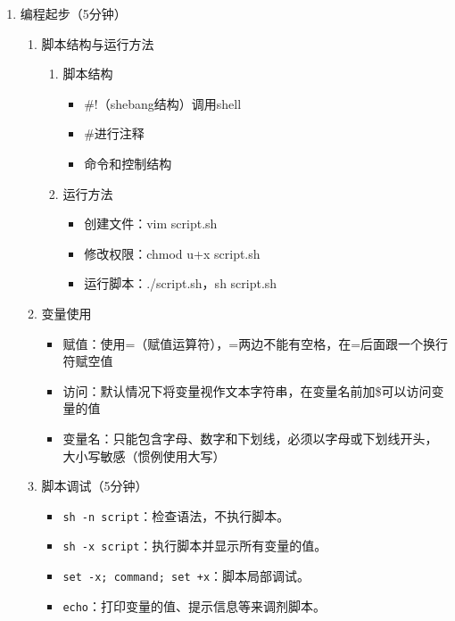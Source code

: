\documentclass{TIJMUjiaoanSY}
\begin{document}

\firstTail


\newpage
\otherHeader

\noindent
\begin{enumerate}
  \item 编程起步（5分钟）
    \begin{enumerate}
      \item 脚本结构与运行方法
	\vspace*{-10pt}
	\begin{multicols}{2}
	\begin{enumerate}
	  \item 脚本结构
	    \begin{itemize}
	      \item \#!（shebang结构）调用shell
	      \item \#进行注释
	      \item 命令和控制结构
	    \end{itemize}
	  \item 运行方法
	    \begin{itemize}
	      \item 创建文件：vim script.sh
	      \item 修改权限：chmod u+x script.sh
	      \item 运行脚本：./script.sh，sh script.sh
	    \end{itemize}
	\end{enumerate}
	\end{multicols}
	\vspace*{-10pt}
      \item 变量使用
	\begin{itemize}
	  \item 赋值：使用=（赋值运算符），=两边不能有空格，在=后面跟一个换行符赋空值
	  \item 访问：默认情况下将变量视作文本字符串，在变量名前加\$可以访问变量的值 
	  \item 变量名：只能包含字母、数字和下划线，必须以字母或下划线开头，大小写敏感（惯例使用大写）
	\end{itemize}
  \item 脚本调试（5分钟）
    \begin{itemize}
      \item \verb|sh -n script|：检查语法，不执行脚本。
      \item \verb|sh -x script|：执行脚本并显示所有变量的值。
      \item \verb|set -x; command; set +x|：脚本局部调试。
      \item \verb|echo|：打印变量的值、提示信息等来调剂脚本。
    \end{itemize}
    \end{enumerate}


\end{enumerate}
\end{document}
